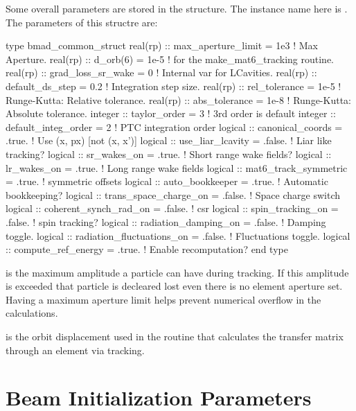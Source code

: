 Some overall parameters are stored in the 
structure. The instance name here is . The parameters of
this structre are:
\begin{example}
  type bmad_common_struct
    real(rp) :: max_aperture_limit = 1e3       ! Max Aperture.
    real(rp) :: d_orb(6)           = 1e-5      ! for the make_mat6_tracking routine.
    real(rp) :: grad_loss_sr_wake  = 0         ! Internal var for LCavities.
    real(rp) :: default_ds_step    = 0.2       ! Integration step size.  
    real(rp) :: rel_tolerance = 1e-5           ! Runge-Kutta: Relative tolerance.
    real(rp) :: abs_tolerance = 1e-8           ! Runge-Kutta: Absolute tolerance.
    integer :: taylor_order = 3                ! 3rd order is default
    integer :: default_integ_order = 2         ! PTC integration order
    logical :: canonical_coords = .true.       ! Use (x, px) [not (x, x')]
    logical :: use_liar_lcavity = .false.      ! Liar like tracking?
    logical :: sr_wakes_on = .true.            ! Short range wake fields?
    logical :: lr_wakes_on = .true.            ! Long range wake fields
    logical :: mat6_track_symmetric = .true.   ! symmetric offsets
    logical :: auto_bookkeeper = .true.        ! Automatic bookkeeping?
    logical :: trans_space_charge_on = .false. ! Space charge switch
    logical :: coherent_synch_rad_on = .false. ! csr 
    logical :: spin_tracking_on = .false.      ! spin tracking?
    logical :: radiation_damping_on = .false.       ! Damping toggle.
    logical :: radiation_fluctuations_on = .false.  ! Fluctuations toggle.
    logical :: compute_ref_energy = .true.          ! Enable recomputation?
  end type
\end{example}

 is the maximum amplitude a particle can have
during tracking. If this amplitude is exceeded that particle is
decleared lost even there is no element aperture set. Having a maximum
aperture limit helps prevent numerical overflow in the calculations.

 is the orbit displacement used in the routine that
calculates the transfer matrix through an element via tracking.

\section{Beam Initialization Parameters}
\label{s:beam_init}


